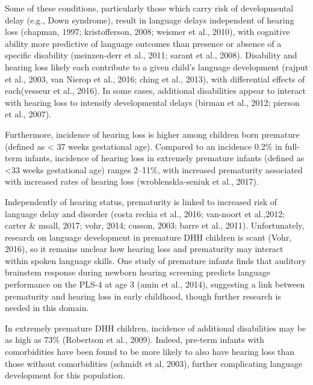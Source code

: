 \documentclass[
]{article}
\begin{document}
Some of these conditions, particularly those which carry risk of
developmental delay (e.g., Down syndrome), result in language delays
independent of hearing loss (chapman, 1997; kristofferson, 2008; weismer
et al., 2010), with cognitive ability more predictive of language
outcomes than presence or absence of a specific disability (meinzen-derr
et al., 2011; sarant et al., 2008). Disability and hearing loss likely
each contribute to a given child's language development (rajput et al.,
2003, van Nierop et al., 2016; ching et al., 2013), with differential
effects of each(vesseur et al., 2016). In some cases, additional
disabilities appear to interact with hearing loss to intensify
developmental delays (birman et al., 2012; pierson et al., 2007).

Furthermore, incidence of hearing loss is higher among children born
premature (defined as \textless{} 37 weeks gestational age). Compared to
an incidence 0.2\% in full-term infants, incidence of hearing loss in
extremely premature infants (defined as \textless33 weeks gestational
age) ranges 2--11\%, with increased prematurity associated with
increased rates of hearing loss (wroblenskla-seniuk et al., 2017).

Independently of hearing status, prematurity is linked to increased risk
of language delay and disorder (costa rechia et al., 2016; van-noort et
al.,2012; carter \& msall, 2017; vohr, 2014; cusson, 2003; barre et al.,
2011). Unfortunately, research on language development in premature DHH
children is scant (Vohr, 2016), so it remains unclear how hearing loss
and prematurity may interact within spoken language skills. One study of
premature infants finds that auditory brainstem response during newborn
hearing screening predicts language performance on the PLS-4 at age 3
(amin et al., 2014), suggesting a link between prematurity and hearing
loss in early childhood, though further research is needed in this
domain.

In extremely premature DHH children, incidence of additional
disabilities may be as high as 73\% (Robertson et al., 2009). Indeed,
pre-term infants with comorbidities have been found to be more likely to
also have hearing loss than those without comorbidities (schmidt et al,
2003), further complicating language development for this population.
\end{document}

